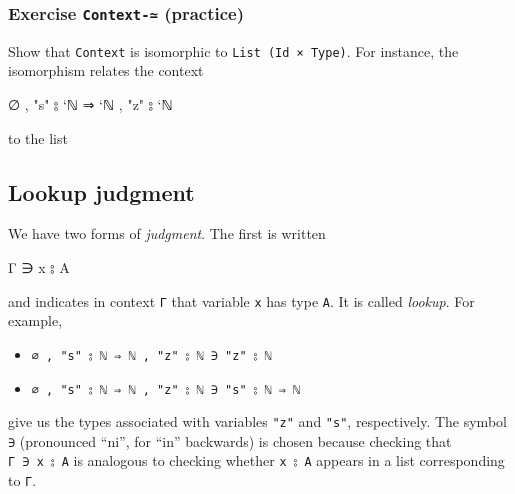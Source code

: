 \hypertarget{exercise-context--practice}{%
\subsubsection{\texorpdfstring{Exercise \texttt{Context-≃}
(practice)}{Exercise Context-≃ (practice)}}\label{exercise-context--practice}}

Show that \texttt{Context} is isomorphic to
\texttt{List\ (Id\ ×\ Type)}. For instance, the isomorphism relates the
context

\begin{myDisplay}
∅ , "s" ⦂ `ℕ ⇒ `ℕ , "z" ⦂ `ℕ
\end{myDisplay}

to the list

\begin{myDisplay}
[ ⟨ "z" , `ℕ ⟩ , ⟨ "s" , `ℕ ⇒ `ℕ ⟩ ]
\end{myDisplay}

\begin{fence}
\begin{code}%
\>[0]\<%
\end{code}
\end{fence}

\hypertarget{lookup-judgment}{%
\subsection{Lookup judgment}\label{lookup-judgment}}

We have two forms of \emph{judgment}. The first is written

\begin{myDisplay}
Γ ∋ x ⦂ A
\end{myDisplay}

and indicates in context \texttt{Γ} that variable \texttt{x} has type
\texttt{A}. It is called \emph{lookup}. For example,

\begin{itemize}
\tightlist
\item
  \texttt{∅\ ,\ "s"\ ⦂\ \textasciigrave{}ℕ\ ⇒\ \textasciigrave{}ℕ\ ,\ "z"\ ⦂\ \textasciigrave{}ℕ\ ∋\ "z"\ ⦂\ \textasciigrave{}ℕ}
\item
  \texttt{∅\ ,\ "s"\ ⦂\ \textasciigrave{}ℕ\ ⇒\ \textasciigrave{}ℕ\ ,\ "z"\ ⦂\ \textasciigrave{}ℕ\ ∋\ "s"\ ⦂\ \textasciigrave{}ℕ\ ⇒\ \textasciigrave{}ℕ}
\end{itemize}

give us the types associated with variables \texttt{"z"} and
\texttt{"s"}, respectively. The symbol \texttt{∋} (pronounced ``ni'',
for ``in'' backwards) is chosen because checking that
\texttt{Γ\ ∋\ x\ ⦂\ A} is analogous to checking whether \texttt{x\ ⦂\ A}
appears in a list corresponding to \texttt{Γ}.

